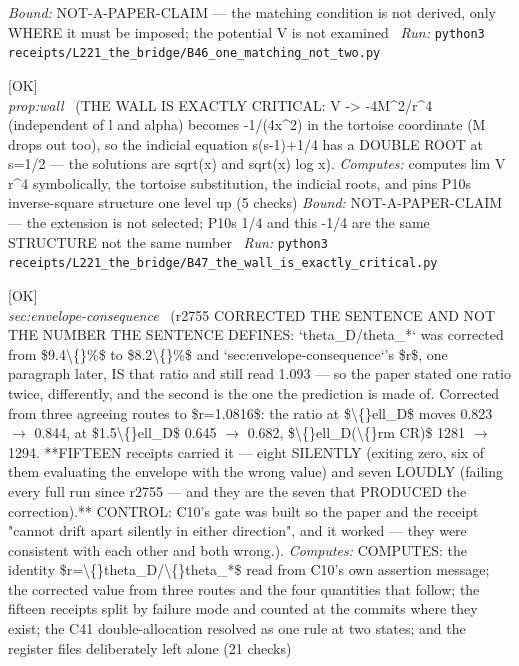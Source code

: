 \begin{description}
 \emph{Bound:} NOT-A-PAPER-CLAIM --- the matching condition is not derived, only WHERE it must be imposed; the potential V is not examined
\ \emph{Run:} \texttt{python3 receipts/L221\_the\_bridge/B46\_one\_matching\_not\_two.py}
\item[\label{rcpt:B47_the_wall_is_exactly_critical}\texttt{B47\_the\_wall\_is\_exactly\_critical}]\hfill\textsf{[OK]}\\
\textit{prop:wall} \ (THE WALL IS EXACTLY CRITICAL: V -> -4M\textasciicircum{}2/r\textasciicircum{}4 (independent of l and alpha) becomes -1/(4x\textasciicircum{}2) in the tortoise coordinate (M drops out too), so the indicial equation s(s-1)+1/4 has a DOUBLE ROOT at s=1/2 --- the solutions are sqrt(x) and sqrt(x) log x). 
\emph{Computes:} computes lim V r\textasciicircum{}4 symbolically, the tortoise substitution, the indicial roots, and pins P10s inverse-square structure one level up (5 checks)
 \emph{Bound:} NOT-A-PAPER-CLAIM --- the extension is not selected; P10s 1/4 and this -1/4 are the same STRUCTURE not the same number
\ \emph{Run:} \texttt{python3 receipts/L221\_the\_bridge/B47\_the\_wall\_is\_exactly\_critical.py}
\item[\label{rcpt:R1_the_correction_stopped_at_the_sentence_and_the_number_it_defines_was_left_behind}\texttt{R1\_the\_correction\_stopped\_at\_the\_sentence\_and\_the\_number\_it\_defines\_was\_left\_behind}]\hfill\textsf{[OK]}\\
\textit{sec:envelope-consequence} \ (r2755 CORRECTED THE SENTENCE AND NOT THE NUMBER THE SENTENCE DEFINES: `theta\_D/theta\_*` was corrected from \$9.4\textbackslash\{\}\%\$ to \$8.2\textbackslash\{\}\%\$ and `sec:envelope-consequence`'s \$r\$, one paragraph later, IS that ratio and still read 1.093 --- so the paper stated one ratio twice, differently, and the second is the one the prediction is made of. Corrected from three agreeing routes to \$r=1.0816\$: the ratio at \$\textbackslash\{\}ell\_D\$ moves 0.823 \ensuremath{\to} 0.844, at \$1.5\textbackslash\{\}ell\_D\$ 0.645 \ensuremath{\to} 0.682, \$\textbackslash\{\}ell\_D(\textbackslash\{\}rm CR)\$ 1281 \ensuremath{\to} 1294. **FIFTEEN receipts carried it --- eight SILENTLY (exiting zero, six of them evaluating the envelope with the wrong value) and seven LOUDLY (failing every full run since r2755 --- and they are the seven that PRODUCED the correction).** CONTROL: C10's gate was built so the paper and the receipt "cannot drift apart silently in either direction", and it worked --- they were consistent with each other and both wrong.). 
\emph{Computes:} COMPUTES: the identity \$r=\textbackslash\{\}theta\_D/\textbackslash\{\}theta\_*\$ read from C10's own assertion message; the corrected value from three routes and the four quantities that follow; the fifteen receipts split by failure mode and counted at the commits where they exist; the C41 double-allocation resolved as one rule at two states; and the register files deliberately left alone (21 checks)

\end{description}
